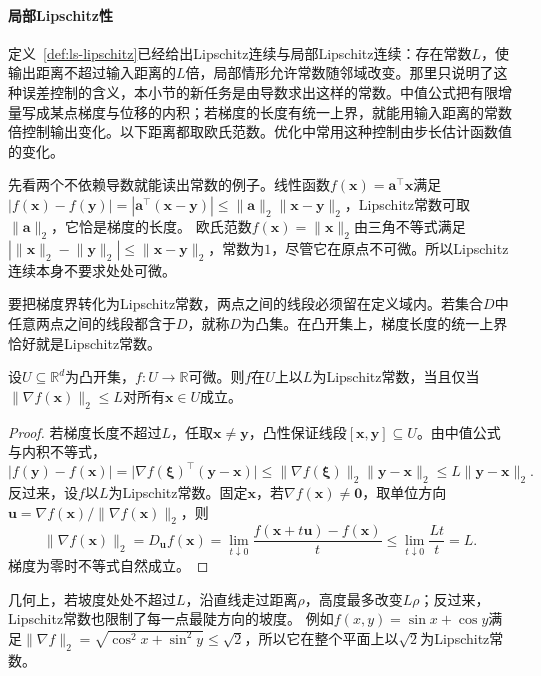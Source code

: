 \paragraph{局部Lipschitz性}
\label{def:multivariable-lipschitz}
定义~\ref{def:ls-lipschitz}已经给出Lipschitz连续与局部Lipschitz连续：存在常数$L$，使输出距离不超过输入距离的$L$倍，局部情形允许常数随邻域改变。那里只说明了这种误差控制的含义，本小节的新任务是由导数求出这样的常数。中值公式把有限增量写成某点梯度与位移的内积；若梯度的长度有统一上界，就能用输入距离的常数倍控制输出变化。以下距离都取欧氏范数。优化中常用这种控制由步长估计函数值的变化。

先看两个不依赖导数就能读出常数的例子。线性函数$f(\bm x)=\bm a^\top\bm x$满足$|f(\bm x)-f(\bm y)|=|\bm a^\top(\bm x-\bm y)|\leq\lVert\bm a\rVert_2\lVert\bm x-\bm y\rVert_2$，Lipschitz常数可取$\lVert\bm a\rVert_2$，它恰是梯度的长度。
欧氏范数$f(\bm x)=\lVert\bm x\rVert_2$由三角不等式满足$|\lVert\bm x\rVert_2-\lVert\bm y\rVert_2|\leq\lVert\bm x-\bm y\rVert_2$，常数为$1$，尽管它在原点不可微。所以Lipschitz连续本身不要求处处可微。

要把梯度界转化为Lipschitz常数，两点之间的线段必须留在定义域内。若集合$D$中任意两点之间的线段都含于$D$，就称$D$为凸集。在凸开集上，梯度长度的统一上界恰好就是Lipschitz常数。
\begin{theorem}[梯度有界与Lipschitz条件]
\label{thm:multivariable-gradient-lipschitz}
设$U\subseteq\mathbb R^d$为凸开集，$f:U\to\mathbb R$可微。则$f$在$U$上以$L$为Lipschitz常数，当且仅当$\lVert\nabla f(\bm x)\rVert_2\leq L$对所有$\bm x\in U$成立。
\end{theorem}
\begin{proof}
若梯度长度不超过$L$，任取$\bm x\neq\bm y$，凸性保证线段$[\bm x,\bm y]\subseteq U$。由中值公式与内积不等式，
\[
 |f(\bm y)-f(\bm x)|=\bigl|\nabla f(\bm\xi)^\top(\bm y-\bm x)\bigr|\leq\lVert\nabla f(\bm\xi)\rVert_2\lVert\bm y-\bm x\rVert_2\leq L\lVert\bm y-\bm x\rVert_2.
\]
反过来，设$f$以$L$为Lipschitz常数。固定$\bm x$，若$\nabla f(\bm x)\neq\bm0$，取单位方向$\bm u=\nabla f(\bm x)/\lVert\nabla f(\bm x)\rVert_2$，则
\[
 \lVert\nabla f(\bm x)\rVert_2=D_{\bm u}f(\bm x)=\lim_{t\downarrow0}\frac{f(\bm x+t\bm u)-f(\bm x)}t\leq\lim_{t\downarrow0}\frac{Lt}t=L.
\]
梯度为零时不等式自然成立。
\end{proof}
几何上，若坡度处处不超过$L$，沿直线走过距离$\rho$，高度最多改变$L\rho$；反过来，Lipschitz常数也限制了每一点最陡方向的坡度。
例如$f(x,y)=\sin x+\cos y$满足$\lVert\nabla f\rVert_2=\sqrt{\cos^2x+\sin^2y}\leq\sqrt2$，所以它在整个平面上以$\sqrt2$为Lipschitz常数。

